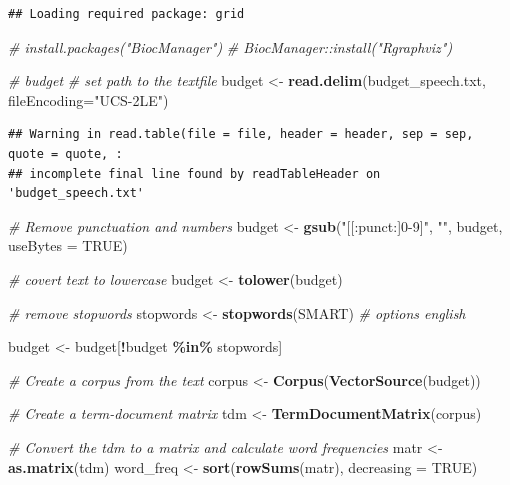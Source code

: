 \documentclass[
]{book}
\newenvironment{Shaded}{\begin{snugshade}}{\end{snugshade}}
\newcommand{\AttributeTok}[1]{\textcolor[rgb]{0.13,0.29,0.53}{#1}}
\newcommand{\CommentTok}[1]{\textcolor[rgb]{0.56,0.35,0.01}{\textit{#1}}}
\newcommand{\ConstantTok}[1]{\textcolor[rgb]{0.56,0.35,0.01}{#1}}
\newcommand{\FunctionTok}[1]{\textcolor[rgb]{0.13,0.29,0.53}{\textbf{#1}}}
\newcommand{\NormalTok}[1]{#1}
\newcommand{\OtherTok}[1]{\textcolor[rgb]{0.56,0.35,0.01}{#1}}
\newcommand{\SpecialCharTok}[1]{\textcolor[rgb]{0.81,0.36,0.00}{\textbf{#1}}}
\newcommand{\StringTok}[1]{\textcolor[rgb]{0.31,0.60,0.02}{#1}}
\begin{document}
\begin{verbatim}
## Loading required package: grid
\end{verbatim}

\begin{Shaded}
\begin{Highlighting}[]
\CommentTok{\# install.packages("BiocManager")}
\CommentTok{\# BiocManager::install("Rgraphviz")}


\CommentTok{\# budget}
\CommentTok{\# set path to the textfile}
\NormalTok{budget }\OtherTok{\textless{}{-}} \FunctionTok{read.delim}\NormalTok{(}\StringTok{\textquotesingle{}budget\_speech.txt\textquotesingle{}}\NormalTok{, }\AttributeTok{fileEncoding=}\StringTok{"UCS{-}2LE"}\NormalTok{)}
\end{Highlighting}
\end{Shaded}

\begin{verbatim}
## Warning in read.table(file = file, header = header, sep = sep, quote = quote, :
## incomplete final line found by readTableHeader on 'budget_speech.txt'
\end{verbatim}

\begin{Shaded}
\begin{Highlighting}[]
\CommentTok{\# Remove punctuation and numbers}
\NormalTok{budget }\OtherTok{\textless{}{-}} \FunctionTok{gsub}\NormalTok{(}\StringTok{"[[:punct:]0{-}9]"}\NormalTok{, }\StringTok{""}\NormalTok{, budget, }\AttributeTok{useBytes =} \ConstantTok{TRUE}\NormalTok{)}

\CommentTok{\# covert text to lowercase}
\NormalTok{budget }\OtherTok{\textless{}{-}} \FunctionTok{tolower}\NormalTok{(budget)}

\CommentTok{\# remove stopwords}
\NormalTok{stopwords }\OtherTok{\textless{}{-}} \FunctionTok{stopwords}\NormalTok{(}\StringTok{\textquotesingle{}SMART\textquotesingle{}}\NormalTok{) }\CommentTok{\# options \textquotesingle{}english\textquotesingle{}}

\NormalTok{budget }\OtherTok{\textless{}{-}}\NormalTok{ budget[}\SpecialCharTok{!}\NormalTok{budget }\SpecialCharTok{\%in\%}\NormalTok{ stopwords]}



\CommentTok{\# Create a corpus from the text}
\NormalTok{corpus }\OtherTok{\textless{}{-}} \FunctionTok{Corpus}\NormalTok{(}\FunctionTok{VectorSource}\NormalTok{(budget))}

\CommentTok{\# Create a term{-}document matrix}
\NormalTok{tdm }\OtherTok{\textless{}{-}} \FunctionTok{TermDocumentMatrix}\NormalTok{(corpus)}

\CommentTok{\# Convert the tdm to a matrix and calculate word frequencies}
\NormalTok{matr }\OtherTok{\textless{}{-}} \FunctionTok{as.matrix}\NormalTok{(tdm)}
\NormalTok{word\_freq }\OtherTok{\textless{}{-}} \FunctionTok{sort}\NormalTok{(}\FunctionTok{rowSums}\NormalTok{(matr), }\AttributeTok{decreasing =} \ConstantTok{TRUE}\NormalTok{)}
\end{Highlighting}
\end{Shaded}
\end{document}
